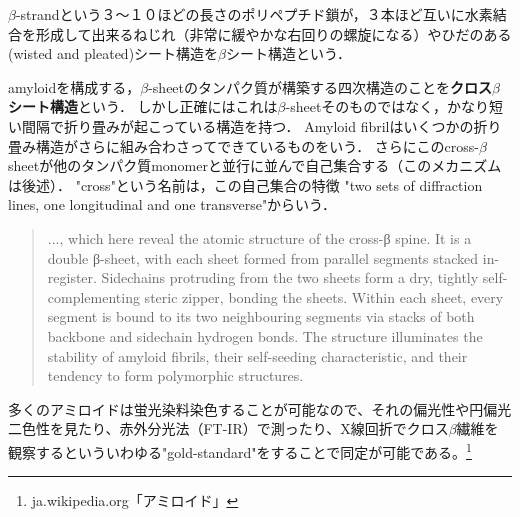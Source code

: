 \documentclass[uplatex, dvipdfmx]{jsreport}
\begin{document}
\begin{definition}
    $\beta$-strandという３〜１０ほどの長さのポリペプチド鎖が，３本ほど互いに水素結合を形成して出来るねじれ（非常に緩やかな右回りの螺旋になる）やひだのある(wisted and pleated)シート構造を$\beta$シート構造という．
\end{definition}
\begin{definition}
    amyloidを構成する，$\beta$-sheetのタンパク質が構築する四次構造のことを\textbf{クロス$\beta$シート構造}という．
    しかし正確にはこれは$\beta$-sheetそのものではなく，かなり短い間隔で折り畳みが起こっている構造を持つ．
    Amyloid fibrilはいくつかの折り畳み構造がさらに組み合わさってできているものをいう．
    さらにこのcross-$\beta$ sheetが他のタンパク質monomerと並行に並んで自己集合する（このメカニズムは後述）．
    "cross"という名前は，この自己集合の特徴
    "two sets of diffraction lines, one longitudinal and one transverse"からいう．
    \begin{quote}
        ..., which here reveal the atomic structure of the cross-β spine. It is a double β-sheet, with each sheet formed from parallel segments stacked in-register. Sidechains protruding from the two sheets form a dry, tightly self-complementing steric zipper, bonding the sheets. Within each sheet, every segment is bound to its two neighbouring segments via stacks of both backbone and sidechain hydrogen bonds. The structure illuminates the stability of amyloid fibrils, their self-seeding characteristic, and their tendency to form polymorphic structures.\cite{cross-beta}
    \end{quote}
\end{definition}
\begin{method}
    多くのアミロイドは蛍光染料染色することが可能なので、それの偏光性や円偏光二色性を見たり、赤外分光法（FT-IR）で測ったり、X線回折でクロス$\beta$繊維を観察するといういわゆる"gold-standard"をすることで同定が可能である。\footnote{ja.wikipedia.org「アミロイド」}
\end{method}
\end{document}
